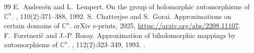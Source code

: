 \documentclass[10pt,a4paper]{amsart}
\begin{document}
\begin{thebibliography}{99}
 E.~Anders{\'e}n and L.~Lempert. \newblock On the group of holomorphic automorphisms of {${\mathbb C}^n$}. , 110(2):371--388, 1992.
 S.~Chatterjee and S.~Gorai. \newblock Approximations on certain domains of $\mathbb{C}^{n}$. \newblock arXiv e-prints, 2025, \url{https://arxiv.org/abs/2208.11107}.
 F.~Forstneri\v{c} and J.-P. Rosay. \newblock Approximation of biholomorphic mappings by automorphisms of {${\mathbb C}^n$}. , 112(2):323--349, 1993. .
\end{thebibliography}
\end{document}
